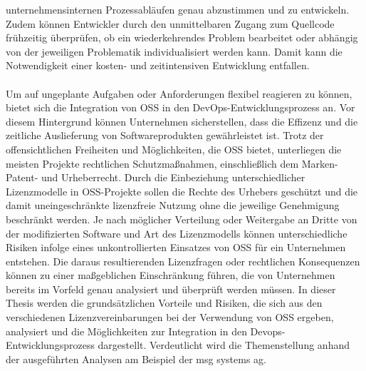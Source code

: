 unternehmensinternen Prozessabläufen genau abzustimmen und zu entwickeln. Zudem können Entwickler durch den unmittelbaren Zugang zum Quellcode frühzeitig überprüfen, ob ein wiederkehrendes Problem bearbeitet oder abhängig von der jeweiligen Problematik individualisiert werden kann. Damit kann die Notwendigkeit einer kosten- und zeitintensiven Entwicklung entfallen.\\\\ Um auf ungeplante Aufgaben oder Anforderungen flexibel reagieren zu können, bietet sich die Integration von OSS in den DevOps-Entwicklungsprozess an. Vor diesem Hintergrund können Unternehmen sicherstellen, dass die Effizenz und die zeitliche Auslieferung von Softwareprodukten gewährleistet ist. Trotz der offensichtlichen Freiheiten und Möglichkeiten, die OSS bietet, unterliegen die meisten Projekte rechtlichen Schutzmaßnahmen, einschließlich dem Marken- Patent- und Urheberrecht. Durch die Einbeziehung unterschiedlicher Lizenzmodelle in OSS-Projekte sollen die Rechte des Urhebers geschützt und die damit uneingeschränkte lizenzfreie Nutzung ohne die jeweilige Genehmigung beschränkt werden. Je nach möglicher Verteilung oder Weitergabe an Dritte von der modifizierten Software und Art des Lizenzmodells können unterschiedliche Risiken infolge eines unkontrollierten Einsatzes von OSS für ein Unternehmen entstehen. Die daraus resultierenden Lizenzfragen oder rechtlichen Konsequenzen können zu einer maßgeblichen Einschränkung führen, die von Unternehmen bereits im Vorfeld genau analysiert und überprüft werden müssen. In dieser Thesis werden die grundsätzlichen Vorteile und Risiken, die sich aus den verschiedenen Lizenzvereinbarungen bei der Verwendung von OSS ergeben, analysiert und die Möglichkeiten zur Integration in den Devops-Entwicklungsprozess dargestellt. Verdeutlicht wird die Themenstellung anhand der ausgeführten Analysen am Beispiel der msg systems ag.


